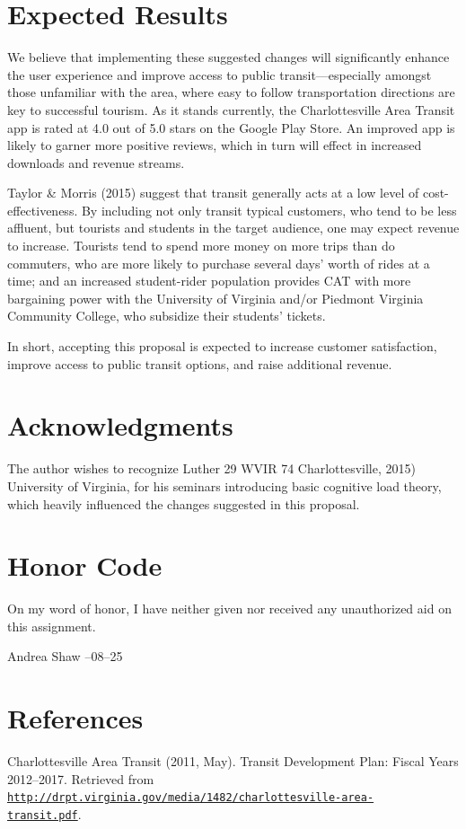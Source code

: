 \documentclass[12pt,letterpaper]{article}
\begin{document}
\section{Expected Results}
We believe that implementing these suggested changes will significantly enhance
the user experience and improve access to public transit---especially amongst
those unfamiliar with the area, where easy to follow transportation directions
are key to successful tourism. As it stands currently, the Charlottesville Area
Transit app is rated at 4.0 out of 5.0 stars on the Google Play Store. An improved
app is likely to garner more positive reviews, which in turn will effect in
increased downloads and revenue streams.

Taylor \& Morris (2015) suggest that transit generally acts at a low level of
cost-effectiveness. By including not only transit typical customers, who tend
to be less affluent, but tourists and students in the target audience, one may
expect revenue to increase. Tourists tend to spend more money on more trips
than do commuters, who are more likely to purchase several days' worth of rides
at a time; and an increased student-rider population provides CAT with more
bargaining power with the University of Virginia and/or Piedmont Virginia
Community College, who subsidize their students' tickets.

In short, accepting this proposal is expected to increase customer satisfaction,
improve access to public transit options, and raise additional revenue.

\section{Acknowledgments}
The author wishes to recognize Luther 29 WVIR
 74 Charlottesville, 2015)
University of Virginia, for his seminars introducing basic
cognitive load theory, which heavily influenced the changes suggested in this
proposal.

\section{Honor Code}
On my word of honor, I have neither given nor received any unauthorized aid on this assignment.
\begin{center}
    Andrea Shaw\qquad {\hrulefill} --08--25
\end{center}

\section{References}
Charlottesville Area Transit (2011, May). Transit Development Plan: Fiscal Years 2012--2017. Retrieved from \href{http://drpt.virginia.gov/media/1482/charlottesville-area-transit.pdf}{\tt http://drpt.virginia.gov/media/1482/charlottesville-area- \\
transit.pdf}.
\end{document}
